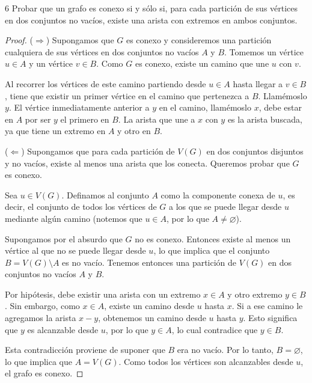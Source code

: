 \begin{ejercicioEntregar}{6}
    Probar que un grafo es conexo si y sólo si, para cada partición de sus vértices en dos conjuntos no vacíos, existe una arista con extremos en ambos conjuntos.
\end{ejercicioEntregar}
\begin{proof}
    (\( \Rightarrow \)) Supongamos que \( G \) es conexo y consideremos una partición cualquiera de sus vértices en dos conjuntos no vacíos \( A \) y \( B \). Tomemos un vértice \( u \in A \) y un vértice \( v \in B \). Como \( G \) es conexo, existe un camino que une \( u \) con \( v \).

    Al recorrer los vértices de este camino partiendo desde \( u \in A \) hasta llegar a \( v \in B \), tiene que existir un primer vértice en el camino que pertenezca a \( B \). Llamémoslo \( y \). El vértice inmediatamente anterior a \( y \) en el camino, llamémoslo \( x \), debe estar en \( A \) por ser \( y \) el primero en \( B \). La arista que une a \( x \) con \( y \) es la arista buscada, ya que tiene un extremo en \( A \) y otro en \( B \).

    (\( \Leftarrow \)) Supongamos que para cada partición de \( V(G) \) en dos conjuntos disjuntos y no vacíos, existe al menos una arista que los conecta. Queremos probar que \( G \) es conexo.

    Sea \( u \in V(G) \). Definamos al conjunto \( A \) como la componente conexa de \( u \), es decir, el conjunto de todos los vértices de \( G \) a los que se puede llegar desde \( u \) mediante algún camino (notemos que \( u \in A \), por lo que \( A \neq \varnothing \)).

    Supongamos por el absurdo que \( G \) no es conexo. Entonces existe al menos un vértice al que no se puede llegar desde \( u \), lo que implica que el conjunto \( B = V(G) \setminus A \) es no vacío. Tenemos entonces una partición de \( V(G) \) en dos conjuntos no vacíos \( A \) y \( B \).

    Por hipótesis, debe existir una arista con un extremo \( x \in A \) y otro extremo \( y \in B \). Sin embargo, como \( x \in A \), existe un camino desde \( u \) hasta \( x \). Si a ese camino le agregamos la arista \( x-y \), obtenemos un camino desde \( u \) hasta \( y \). Esto significa que \( y \) es alcanzable desde \( u \), por lo que \( y \in A \), lo cual contradice que \( y \in B \).

    Esta contradicción proviene de suponer que \( B \) era no vacío. Por lo tanto, \( B = \varnothing \), lo que implica que \( A = V(G) \). Como todos los vértices son alcanzables desde \( u \), el grafo es conexo.


\end{proof}
